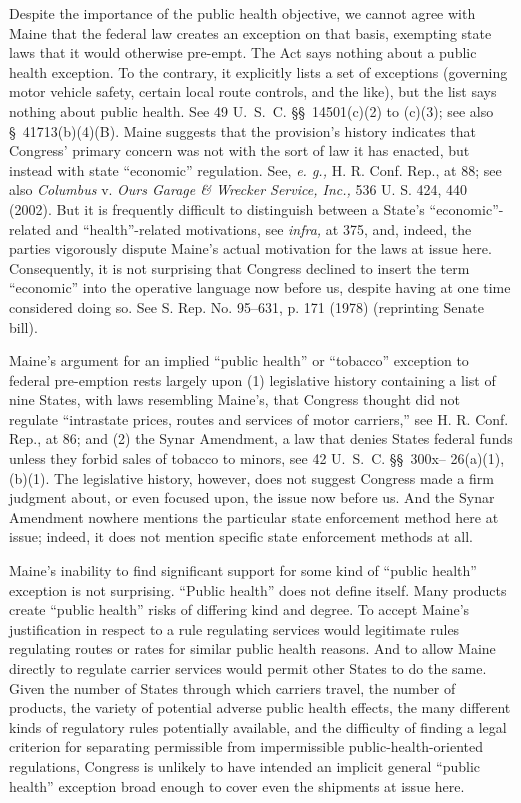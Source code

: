 {{  Despite the importance of the public health objective, we cannot
agree with Maine that the federal law creates an exception on that
basis, exempting state laws that it would otherwise pre-empt. The
Act says nothing about a public health exception. To the contrary,
it explicitly lists a set of exceptions (governing motor vehicle
safety, certain local route controls, and the like), but the list says
nothing about public health. See 49 U.~S.~C. \S\S~14501(c)(2)
to (c)(3); see also \S~41713(b)(4)(B). Maine suggests that the
provision's history indicates that Congress' primary concern
was not with the sort of law it has enacted, but instead with state
``economic'' regulation. See, \emph{e. g.,} H. R. Conf. Rep., at 88;
see also \emph{Columbus} v. \emph{Ours Garage \& Wrecker Service, Inc.,} 536
U. S. 424, 440 (2002). But it is frequently difficult to distinguish
between a State's ``economic''-related and ``health''-related
motivations, see \emph{infra,} at 375, and, indeed, the parties
vigorously dispute Maine's actual motivation for the laws at issue
here. Consequently, it is not surprising that Congress declined to
insert the term ``economic'' into the operative language now before
us, despite having at one time considered doing so. See S. Rep. No.
95--631, p. 171 (1978) (reprinting Senate bill).

  Maine's argument for an implied ``public health'' or ``tobacco''
exception to federal pre-emption rests largely upon (1) legislative
history containing a list of nine States, with laws resembling
Maine's, that Congress thought did not regulate ``intrastate prices,
routes and services of motor carriers,'' see H. R. Conf. Rep., at
86; and (2) the Synar Amendment, a law that denies States federal
funds unless they forbid sales of tobacco to minors, see 42 U.~S.~C.
\S\S~300x-- 26(a)(1), (b)(1). The legislative history, however,
does not suggest Congress made a firm judgment about, or even focused
upon, the issue now before us. And the Synar \newpage  Amendment nowhere
mentions the particular state enforcement method here at issue; indeed,
it does not mention specific state enforcement methods at all.

  Maine's inability to find significant support for some kind of
``public health'' exception is not surprising. ``Public health''
does not define itself. Many products create ``public health'' risks
of differing kind and degree. To accept Maine's justification in
respect to a rule regulating services would legitimate rules regulating
routes or rates for similar public health reasons. And to allow Maine
directly to regulate carrier services would permit other States
to do the same. Given the number of States through which carriers
travel, the number of products, the variety of potential adverse
public health effects, the many different kinds of regulatory rules
potentially available, and the difficulty of finding a legal criterion
for separating permissible from impermissible public-health-oriented
regulations, Congress is unlikely to have intended an implicit general
``public health'' exception broad enough to cover even the shipments
at issue here.

}}
